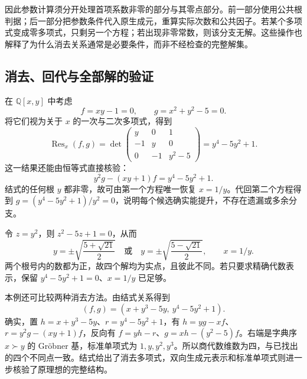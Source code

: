 \ProseParagraphBreak
因此参数计算须分开处理首项系数非零的部分与其零点部分。前一部分使用公共根判据；后一部分把参数条件代入原生成元，重算实际次数和公共因子。若某个多项式变成零多项式，只剩另一个方程；若出现非零常数，则该分支无解。这些操作也解释了为什么消去关系通常是必要条件，而非不经检查的完整解集。

\subsection{消去、回代与全部解的验证}
\label{b3:subsec:0806:04}

在 \(\mathbb Q[x,y]\) 中考虑
\[
	f=xy-1=0,\qquad g=x^2+y^2-5=0.
\]
将它们视为关于 \(x\) 的一次与二次多项式，得到
\[
	\operatorname{Res}_x(f,g)
	=\det\begin{pmatrix}y&0&1\\-1&y&0\\0&-1&y^2-5\end{pmatrix}
	=y^4-5y^2+1.
\]
这一结果还能由恒等式直接核验：
\[
	y^2g-(xy+1)f=y^4-5y^2+1.
\]
结式的任何根 \(y\) 都非零，故可由第一个方程唯一恢复 \(x=1/y\)。代回第二个方程得到 \(g=(y^4-5y^2+1)/y^2=0\)，说明每个候选确实能提升，不存在遗漏或多余分支。

\ProseParagraphBreak
令 \(z=y^2\)，则 \(z^2-5z+1=0\)，从而
\[
	y=\pm\sqrt{\dfrac{5+\sqrt{21}}{2}} \quad\text{或}\quad y=\pm\sqrt{\dfrac{5-\sqrt{21}}{2}},\qquad x=1/y.
\]
两个根号内的数都为正，故四个解均为实点，且彼此不同。若只要求精确代数表示，保留 \(y^4-5y^2+1=0\)、\(x=1/y\) 已足够。

\ProseParagraphBreak
本例还可比较两种消去方法。由结式关系得到
\[
	(f,g)=(x+y^3-5y,\ y^4-5y^2+1).
\]
确实，置 \(h=x+y^3-5y\)、\(r=y^4-5y^2+1\)，有 \(h=yg-xf\)、\(r=y^2g-(xy+1)f\)，反向有 \(f=yh-r\)、\(g=xh-(y^2-5)f\)。右端是字典序 \(x\succ y\) 的 Gröbner 基，标准单项式为 \(1,y,y^2,y^3\)。所以商代数维数为四，与已找出的四个不同点一致。结式给出了消去多项式，双向生成元表示和标准单项式则进一步核验了原理想的完整结构。

